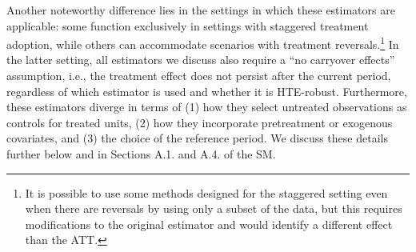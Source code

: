 \documentclass[12pt]{article}
\begin{document}
Another noteworthy difference lies in the settings in which these estimators are applicable: some function exclusively in settings with staggered treatment adoption, while others can accommodate scenarios with treatment reversals.\footnote{It is possible to use some methods designed for the staggered setting even when there are reversals by using only a subset of the data, but this requires modifications to the original estimator and would identify a different effect than the ATT.} In the latter setting, all estimators we discuss also require a ``no carryover effects'' assumption, i.e., the treatment effect does not persist after the current period, regardless of which estimator is used and whether it is HTE-robust.
Furthermore, these estimators diverge in terms of (1) how they
select untreated observations as controls for treated units, (2) how
they incorporate pretreatment or exogenous covariates, and (3) the choice of
the reference period. We discuss these details further below and in Sections A.1. and A.4. of the SM.
\end{document}
